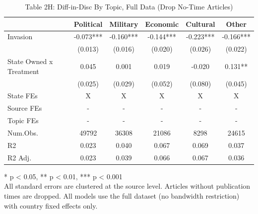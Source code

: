 \begin{table}[!t]
\caption{Table 2H: Diff-in-Disc By Topic, Full Data (Drop No-Time Articles)} 
\fontsize{12.0pt}{14.4pt}\selectfont
\begin{tabular*}{\linewidth}{@{\extracolsep{\fill}}lccccc}
\toprule
  & Political & Military & Economic & Cultural & Other \\ 
\midrule\addlinespace[2.5pt]
Invasion & -0.073*** & -0.160*** & -0.144*** & -0.223*** & -0.166*** \\ 
 & (0.013) & (0.016) & (0.020) & (0.026) & (0.022) \\ 
State Owned x Treatment & 0.045 & 0.001 & 0.019 & -0.020 & 0.131** \\ 
{} & {(0.025)} & {(0.029)} & {(0.052)} & {(0.080)} & {(0.045)} \\ 
State FEs & X & X & X & X & X \\ 
Source FEs & - & - & - & - & - \\ 
Topic FEs & - & - & - & - & - \\ 
Num.Obs. & 49792 & 36308 & 21086 & 8298 & 24615 \\ 
R2 & 0.023 & 0.040 & 0.067 & 0.069 & 0.037 \\ 
R2 Adj. & 0.023 & 0.039 & 0.066 & 0.067 & 0.036 \\ 
\bottomrule
\end{tabular*}
\begin{minipage}{\linewidth}
* p < 0.05, ** p < 0.01, *** p < 0.001\\
All standard errors are clustered at the source level. Articles without
publication times are dropped. All models use the full dataset (no bandwidth
restriction) with country fixed effects only.\\
\end{minipage}
\end{table}


